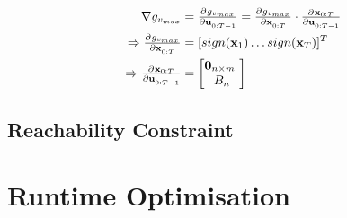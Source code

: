 \begin{align}
\nabla g_{v_{max}} &= \pd{g_{v_{max}}}{\u_{0:T-1}} = \pd{g_{v_{max}}}{\x_{0:T}} \cdot \pd{\x_{0:T}}{\u_{0:T-1}} \\
\Rightarrow \pd{g_{v_{max}}}{\x_{0:T}} &= [sign(\x_1) \hdots sign(\x_T)]^T \\
\Rightarrow \pd{\x_{0:T}}{\u_{0:T-1}} &= \begin{bmatrix} \mathbf{0}_{n \times m} \\ B_n \end{bmatrix}
\end{align}
 

\subsection{Reachability Constraint}
\label{text:approach/constraint/reachability}



\section{Runtime Optimisation}
\label{text:approach/runtime}

